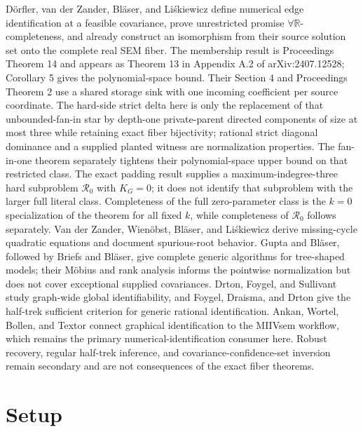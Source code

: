 \documentclass{article}
\begin{document}
Dörfler, van der Zander, Bläser, and Liśkiewicz define numerical edge identification at a feasible covariance, prove unrestricted promise \(\forall\mathbb R\)-completeness, and already construct an isomorphism from their source solution set onto the complete real SEM fiber. The membership result is Proceedings Theorem 14 and appears as Theorem 13 in Appendix A.2 of arXiv:2407.12528; Corollary 5 gives the polynomial-space bound. Their Section 4 and Proceedings Theorem 2 use a shared storage sink with one incoming coefficient per source coordinate. The hard-side strict delta here is only the replacement of that unbounded-fan-in star by depth-one private-parent directed components of size at most three while retaining exact fiber bijectivity; rational strict diagonal dominance and a supplied planted witness are normalization properties. The fan-in-one theorem separately tightens their polynomial-space upper bound on that restricted class. The exact padding result supplies a maximum-indegree-three hard subproblem \(\mathcal R_0\) with \(K_G=0\); it does not identify that subproblem with the larger full literal class. Completeness of the full zero-parameter class is the \(k=0\) specialization of the theorem for all fixed \(k\), while completeness of \(\mathcal R_0\) follows separately. Van der Zander, Wienöbst, Bläser, and Liśkiewicz derive missing-cycle quadratic equations and document spurious-root behavior. Gupta and Bläser, followed by Briefs and Bläser, give complete generic algorithms for tree-shaped models; their Möbius and rank analysis informs the pointwise normalization but does not cover exceptional supplied covariances. Drton, Foygel, and Sullivant study graph-wide global identifiability, and Foygel, Draisma, and Drton give the half-trek sufficient criterion for generic rational identification. Ankan, Wortel, Bollen, and Textor connect graphical identification to the MIIVsem workflow, which remains the primary numerical-identification consumer here. Robust recovery, regular half-trek inference, and covariance-confidence-set inversion remain secondary and are not consequences of the exact fiber theorems.

\section{Setup}
\end{document}
